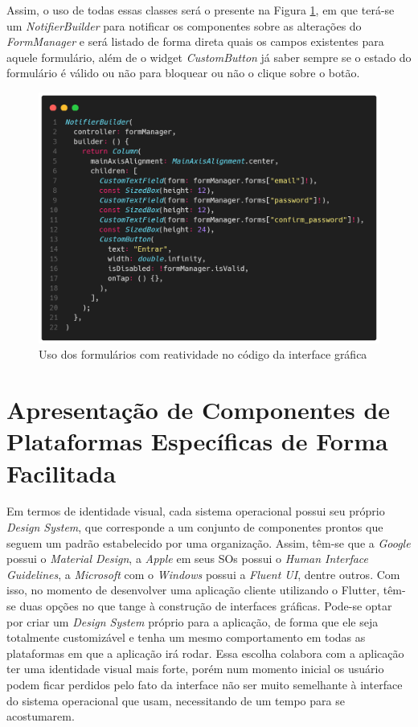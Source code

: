 \documentclass[12pt, %
openright, 
oneside, %
a4paper,    %
brazil]{facom-ufu-abntex2}
\begin{document}
Assim, o uso de todas essas classes será o presente na Figura \ref{fig:use_of_form_proposal}, em que terá-se um \textit{NotifierBuilder} para notificar os componentes sobre as alterações do \textit{FormManager} e será listado de forma direta quais os campos existentes para aquele formulário, além de o widget \textit{CustomButton} já saber sempre se o estado do formulário é válido ou não para bloquear ou não o clique sobre o botão.

\begin{figure}[ht]
    \centering
    \includegraphics[width=.65\textwidth, trim={0 30 0 100}, clip]{figures/forms/use_of_form_proposal.png}
    \caption{Uso dos formulários com reatividade no código da interface gráfica}
    \label{fig:use_of_form_proposal}
\end{figure}


\section{Apresentação de Componentes de Plataformas Específicas de Forma Facilitada}

Em termos de identidade visual, cada sistema operacional possui seu próprio \textit{Design System}, que corresponde a um conjunto de componentes prontos que seguem um padrão estabelecido por uma organização. Assim, têm-se que a \textit{Google} possui o \textit{Material Design}, a \textit{Apple} em seus SOs possui o \textit{Human Interface Guidelines}, a \textit{Microsoft} com o \textit{Windows} possui a \textit{Fluent UI}, dentre outros. Com isso, no momento de desenvolver uma aplicação cliente utilizando o Flutter, têm-se duas opções no que tange à construção de interfaces gráficas. Pode-se optar por criar um \textit{Design System} próprio para a aplicação, de forma que ele seja totalmente customizável e tenha um mesmo comportamento em todas as plataformas em que a aplicação irá rodar. Essa escolha colabora com a aplicação ter uma identidade visual mais forte, porém num momento inicial os usuário podem ficar perdidos pelo fato da interface não ser muito semelhante à interface do sistema operacional que usam, necessitando de um tempo para se acostumarem.
\end{document}
